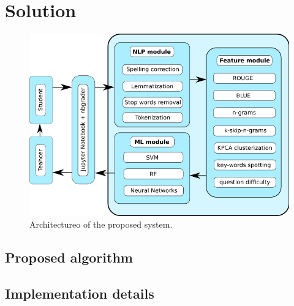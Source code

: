 
\chapter{Solution}


\begin{figure}[h!]
  \centering
  \includegraphics[width=\textwidth]{img/architecture}
    \caption{ Architectureo of the proposed system.}\label{fig:architecture}
\end{figure}

\section{Proposed algorithm}


\section{Implementation details}
